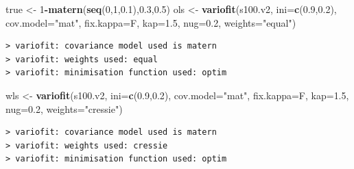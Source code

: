 \documentclass[b5paper,]{scrbook}
\makeatletter
\newenvironment{Shaded}{\begin{snugshade}}{\end{snugshade}}
\newcommand{\KeywordTok}[1]{\textcolor[rgb]{0.13,0.29,0.53}{\textbf{#1}}}
\newcommand{\DataTypeTok}[1]{\textcolor[rgb]{0.13,0.29,0.53}{#1}}
\newcommand{\DecValTok}[1]{\textcolor[rgb]{0.00,0.00,0.81}{#1}}
\newcommand{\FloatTok}[1]{\textcolor[rgb]{0.00,0.00,0.81}{#1}}
\newcommand{\StringTok}[1]{\textcolor[rgb]{0.31,0.60,0.02}{#1}}
\newcommand{\OperatorTok}[1]{\textcolor[rgb]{0.81,0.36,0.00}{\textbf{#1}}}
\newcommand{\NormalTok}[1]{#1}
\theoremstyle{plain}
\theoremstyle{definition}
\numberwithin{equation}{section}
\newenvironment{kframe}{%
\medskip{}
\setlength{\fboxsep}{.8em}
 \def\at@end@of@kframe{}%
 \ifinner\ifhmode%
  \def\at@end@of@kframe{\end{minipage}}%
  \begin{minipage}{\columnwidth}%
 \fi\fi%
 \def\FrameCommand##1{\hskip\@totalleftmargin \hskip-\fboxsep
 \colorbox{shadecolor}{##1}\hskip-\fboxsep
     \hskip-\linewidth \hskip-\@totalleftmargin \hskip\columnwidth}%
 \MakeFramed {\advance\hsize-\width
   \@totalleftmargin\z@ \linewidth\hsize
   \@setminipage}}%
 {\par\unskip\endMakeFramed%
 \at@end@of@kframe}
\renewenvironment{Shaded}{\begin{kframe}}{\end{kframe}}
\makeatother
\begin{document}
\begin{Shaded}
\begin{Highlighting}[]
\NormalTok{true <-}\StringTok{ }\DecValTok{1}\OperatorTok{-}\KeywordTok{matern}\NormalTok{(}\KeywordTok{seq}\NormalTok{(}\DecValTok{0}\NormalTok{,}\DecValTok{1}\NormalTok{,}\FloatTok{0.1}\NormalTok{),}\FloatTok{0.3}\NormalTok{,}\FloatTok{0.5}\NormalTok{)}
\NormalTok{ols <-}\StringTok{ }\KeywordTok{variofit}\NormalTok{(s100.v2, }\DataTypeTok{ini=}\KeywordTok{c}\NormalTok{(}\FloatTok{0.9}\NormalTok{,}\FloatTok{0.2}\NormalTok{), }\DataTypeTok{cov.model=}\StringTok{"mat"}\NormalTok{,}
                \DataTypeTok{fix.kappa=}\NormalTok{F, }\DataTypeTok{kap=}\FloatTok{1.5}\NormalTok{, }\DataTypeTok{nug=}\FloatTok{0.2}\NormalTok{, }\DataTypeTok{weights=}\StringTok{"equal"}\NormalTok{)}
\end{Highlighting}
\end{Shaded}

\begin{verbatim}
> variofit: covariance model used is matern 
> variofit: weights used: equal 
> variofit: minimisation function used: optim
\end{verbatim}

\begin{Shaded}
\begin{Highlighting}[]
\NormalTok{wls <-}\StringTok{ }\KeywordTok{variofit}\NormalTok{(s100.v2, }\DataTypeTok{ini=}\KeywordTok{c}\NormalTok{(}\FloatTok{0.9}\NormalTok{,}\FloatTok{0.2}\NormalTok{), }\DataTypeTok{cov.model=}\StringTok{"mat"}\NormalTok{,}
                \DataTypeTok{fix.kappa=}\NormalTok{F, }\DataTypeTok{kap=}\FloatTok{1.5}\NormalTok{, }\DataTypeTok{nug=}\FloatTok{0.2}\NormalTok{, }\DataTypeTok{weights=}\StringTok{"cressie"}\NormalTok{)}
\end{Highlighting}
\end{Shaded}

\begin{verbatim}
> variofit: covariance model used is matern 
> variofit: weights used: cressie 
> variofit: minimisation function used: optim
\end{verbatim}
\end{document}
